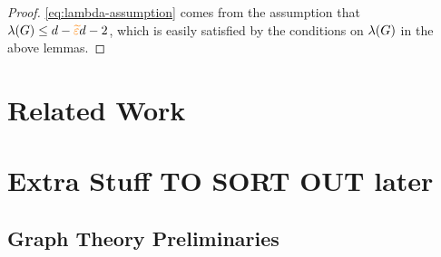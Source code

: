 \documentclass[11pt]{article}
\begin{document}
\begin{proof}
\eqref{eq:lambda-assumption} comes from the assumption that $\lambda(G) \leq d - \textcolor{orange}{\widetilde{\varepsilon}} d - 2$, which is easily satisfied by the conditions on $\lambda(G)$ in the above lemmas.

\end{proof}

\section{Related Work}
\label{sec:related-work}






\clearpage
\appendix
\section{Extra Stuff TO SORT OUT later}
\subsection{Graph Theory Preliminaries}
\end{document}
